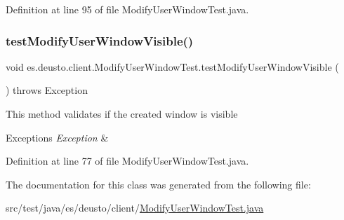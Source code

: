 Definition at line 95 of file Modify\+User\+Window\+Test.\+java.

\mbox{\label{classes_1_1deusto_1_1client_1_1_modify_user_window_test_aaa2f9f6ce4607df013e00284b44f1973}} 
\subsubsection{\texorpdfstring{test\+Modify\+User\+Window\+Visible()}{testModifyUserWindowVisible()}}
{\footnotesize\ttfamily void es.\+deusto.\+client.\+Modify\+User\+Window\+Test.\+test\+Modify\+User\+Window\+Visible (\begin{DoxyParamCaption}{ }\end{DoxyParamCaption}) throws Exception}

This method validates if the created window is visible


\begin{DoxyExceptions}{Exceptions}
{\em Exception} & \\
\hline
\end{DoxyExceptions}


Definition at line 77 of file Modify\+User\+Window\+Test.\+java.



The documentation for this class was generated from the following file\+:\begin{DoxyCompactItemize}
\item 
src/test/java/es/deusto/client/\hyperlink{_modify_user_window_test_8java}{Modify\+User\+Window\+Test.\+java}\end{DoxyCompactItemize}
